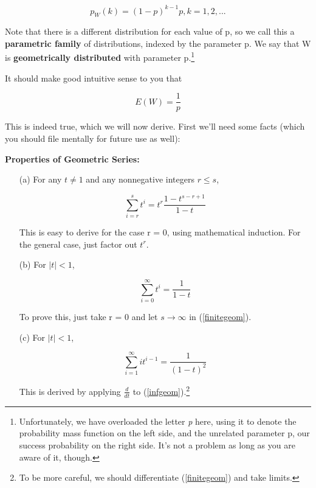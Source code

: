 \begin{equation}
\label{geompmf}
p_W(k) = (1-p)^{k-1} p, k = 1,2,...
\end{equation}

Note that there is a different distribution for each value of p, so we
call this a {\bf parametric family} of distributions, indexed by the
parameter p.  We say that W is {\bf geometrically distributed} with
parameter p.\footnote{Unfortunately, we have overloaded the letter {\it
p} here, using it to denote the probability mass function on the left
side, and the unrelated parameter p, our success probability on the
right side.  It's not a problem as long as you are aware of it, though.}

It should make good intuitive sense to you that

\begin{equation}
\label{eofgeom}
E(W) = \frac{1}{p}
\end{equation}

This is indeed true, which we will now derive.  First we'll need some
facts (which you should file mentally for future use as well):

{\bf Properties of Geometric Series:}

\begin{itemize}

\item [(a)] For any $t \neq 1$ and any nonnegative integers $r \leq s$,

\begin{equation}
\label{finitegeom}
\sum_{i=r}^s t^i = t^r \frac{1-t^{s-r+1}}{1-t}
\end{equation}

This is easy to derive for the case r = 0, using mathematical induction.
For the general case, just factor out $t^{r}$.

\item [(b)] For $|t| < 1$,

\begin{equation}
\label{infgeom}
\sum_{i=0}^{\infty} t^i = \frac{1}{1-t}
\end{equation}

To prove this, just take r = 0 and let $s \rightarrow \infty$ in
(\ref{finitegeom}).

\item [(c)] For $|t| < 1$,

\begin{equation}
\label{derivgeom}
\sum_{i=1}^{\infty} i t^{i-1} = \frac{1}{(1-t)^2}
\end{equation}

This is derived by applying $\frac{d}{dt}$ to
(\ref{infgeom}).\footnote{To be more careful, we should differentiate
(\ref{finitegeom}) and take limits.}

\end{itemize}

